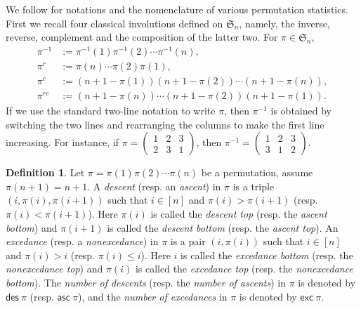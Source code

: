 \documentclass[12pt,reqno]{amsart}
\numberwithin{equation}{section}
\theoremstyle{plain}
\theoremstyle{definition}
\newtheorem{Def}[theorem]{Definition}
\def\S{\mathfrak{S}}
\def\exc{\mathsf{exc}}
\def\des{\mathsf{des}}
\def\asc{\mathsf{asc}}
\begin{document}
We follow \cite{CSZ, SZ10, SZ12} for notations and the nomenclature of various permutation statistics. First we recall four classical involutions defined on $\S_n$, namely, the inverse, reverse, complement and the composition of the latter two. For $\pi\in\S_n$,
\begin{align*}
\pi^{-1} &:=\pi^{-1}(1)\pi^{-1}(2)\cdots\pi^{-1}(n),\\
\pi^r &:=\pi(n)\cdots\pi(2)\pi(1),\\
\pi^c &:=(n+1-\pi(1))(n+1-\pi(2))\cdots(n+1-\pi(n)),\\
\pi^{rc} &:=(n+1-\pi(n))\cdots(n+1-\pi(2))(n+1-\pi(1)).
\end{align*}
If we use the standard two-line notation to write $\pi$, then $\pi^{-1}$ is obtained by switching the two lines and rearranging the columns to make the first line increasing. For instance, if $\pi=\left(\begin{array}{ccc} 1 & 2 & 3\\ 2 & 3 & 1 \end{array}\right)$, then $\pi^{-1}=\left(\begin{array}{ccc} 1 & 2 & 3\\ 3 & 1 & 2 \end{array}\right)$.

\begin{Def}
Let $\pi=\pi(1)\pi(2)\cdots\pi(n)$ be a permutation, assume $\pi(n+1)=n+1$. A \emph{descent} (resp. an \emph{ascent}) in $\pi$ is a triple $(i,\pi(i),\pi(i+1))$ such that $i\in [n]$ and $\pi(i)>\pi(i+1)$ (resp. $\pi(i)<\pi(i+1)$). Here $\pi(i)$ is called the \emph{descent top} (resp. the \emph{ascent bottom}) and $\pi(i+1)$ is called the \emph{descent bottom} (resp. the \emph{ascent top}). An \emph{excedance} (resp. a \emph{nonexcedance}) in $\pi$ is a pair $(i,\pi(i))$ such that $i\in [n]$ and $\pi(i)>i$ (resp. $\pi(i)\le i$). Here $i$ is called the \emph{excedance bottom} (resp. the \emph{nonexcedance top}) and $\pi(i)$ is called the \emph{excedance top} (resp. the \emph{nonexcedance bottom}). The \emph{number of descents} (resp. the \emph{number of ascents}) in $\pi$ is denoted by $\des\:\pi$ (resp. $\asc\:\pi$), and the \emph{number of excedances} in $\pi$ is denoted by $\exc\:\pi$.
\end{Def}
\end{document}
